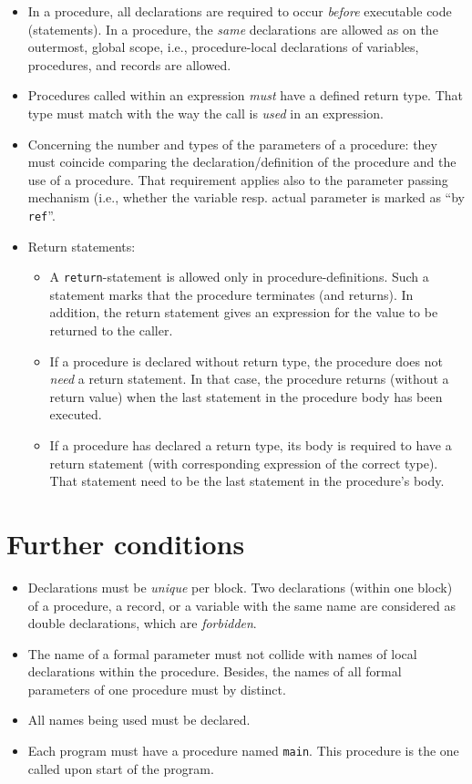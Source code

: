 \documentclass[11pt]{article}
\begin{document}
\begin{itemize}
\item In a procedure, all declarations are required to occur \emph{before}
executable code (statements).  In a procedure, the \emph{same} declarations
are allowed as on the outermost, global scope, i.e., procedure-local
declarations of variables, procedures, and records are allowed.
\item Procedures called within an expression \emph{must} have a defined return
type. That type must match with the way the call is \emph{used} in an
expression.
\item Concerning the number and types of the parameters of a procedure: they
must coincide comparing the declaration/definition of the procedure and
the use of a procedure. That requirement applies also to the parameter
passing mechanism (i.e., whether the variable resp. actual parameter is
marked as ``by \texttt{ref}''.
\item Return statements:
\begin{itemize}
\item A \texttt{return}-statement is allowed only in procedure-definitions. Such a
statement marks that the procedure terminates (and returns). In
addition, the return statement gives an expression for the value to be
returned to the caller.
\item If a procedure is declared without return type, the procedure does not
\emph{need} a return statement. In that case, the procedure returns
(without a return value) when the last statement in the procedure body
has been  executed.
\end{itemize}
\begin{itemize}
\item If a procedure has declared a return type, its body is required to have
a return statement (with corresponding expression of the correct
type). That statement need to be the last statement in the procedure's
body.
\end{itemize}
\end{itemize}




\section{Further conditions}
\label{sec:orgf932ddf}

\begin{itemize}
\item Declarations must be \emph{unique} per block. Two declarations (within one
block) of a procedure, a record, or a variable with the same name are
considered as double declarations, which are \emph{forbidden}.
\item The name of a formal parameter must not collide with names of local
declarations within the procedure. Besides, the names of all formal
parameters of one procedure must by distinct.
\item All names being used must be declared.
\item Each program must have a procedure named \texttt{main}. This procedure is the one
called upon start of the program.
\end{itemize}
\end{document}
